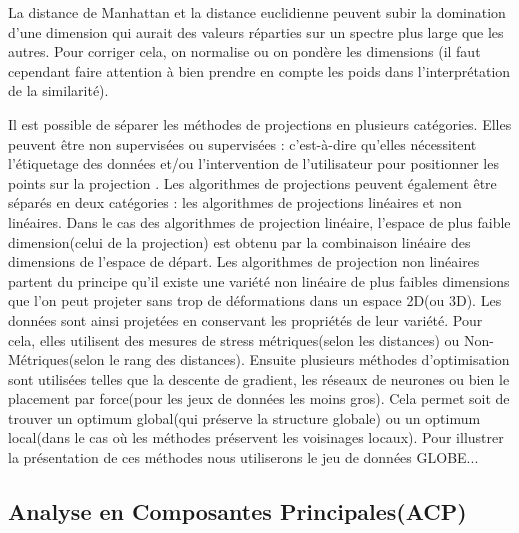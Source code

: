 \smallskip
La distance de Manhattan et la distance euclidienne peuvent subir la domination d’une dimension qui aurait des valeurs réparties sur un spectre plus large que les autres\cite{HeulotThese}. Pour corriger cela, on normalise ou on pondère les dimensions (il faut cependant faire attention à bien prendre en compte les poids dans l’interprétation de la similarité).

\medskip
Il est possible de séparer les méthodes de projections en plusieurs catégories.
Elles peuvent être non supervisées ou supervisées : c’est-à-dire qu’elles nécessitent l’étiquetage des données et/ou l’intervention de l’utilisateur pour positionner les points sur la projection\cite{karimi2018Supervised} \cite{HeulotThese}. 
Les algorithmes de projections peuvent également être séparés en deux catégories : les algorithmes de projections linéaires et non linéaires.
Dans le cas des algorithmes de projection linéaire, l’espace de plus faible dimension(celui de la projection) est obtenu par la combinaison linéaire des dimensions de l’espace de départ.
\smallskip
\newline
Les algorithmes de projection non linéaires partent du principe qu'il existe une variété non linéaire de plus faibles dimensions que l’on peut projeter sans trop de déformations dans un espace 2D(ou 3D). Les données sont ainsi projetées en conservant les propriétés de leur variété. Pour cela, elles utilisent des mesures de stress métriques(selon les distances) ou Non-Métriques(selon le rang des distances). 
Ensuite plusieurs méthodes d’optimisation sont utilisées telles que la descente de gradient, les réseaux de neurones\cite{hwang1991GradientNeuralNetwork} ou bien le placement par force(pour les jeux de données les moins gros)\cite{dickhaus2014ForceBrute}. 
Cela permet soit de trouver un optimum global(qui préserve la structure globale) ou un optimum local(dans le cas où les méthodes préservent les voisinages locaux).
Pour illustrer la présentation de ces méthodes nous utiliserons le jeu de données GLOBE... 
\smallskip



\subsection{Analyse en Composantes Principales(ACP)}

